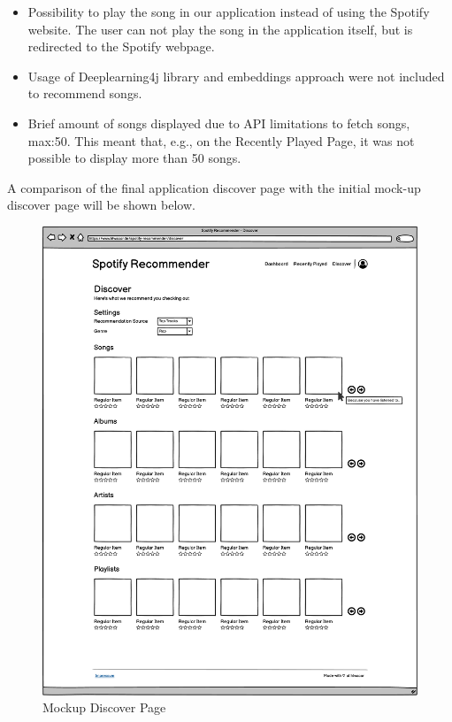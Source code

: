 \begin{itemize}
\begin{itemize}
        \item Possibility to play the song in our application instead of using the Spotify website. The user can not play the song in the application itself, but is redirected to the Spotify webpage.
        \item Usage of Deeplearning4j library and embeddings approach were not included to recommend songs.
        \item Brief amount of songs displayed due to API limitations to fetch songs, max:50. This meant that, e.g., on the Recently Played Page, it was not possible to display more than 50 songs.
    \end{itemize}
\end{itemize}

A comparison of the final application discover page with the initial mock-up discover page will be shown below.

\begin{figure}[bth]
    \centering
    \includegraphics[width=1.0\textwidth]{Graphics/Chapter1/MockupDiscoverPage.pdf}
    \caption{Mockup Discover Page}
\end{figure}

